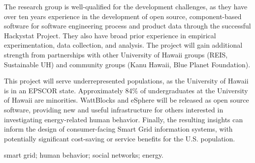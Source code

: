 The research group is well-qualified for the development challenges, as
they have over ten years experience in the development of open source,
component-based software for software engineering process and product data
through the successful Hackystat Project.  They also have broad prior experience
in empirical experimentation, data collection, and analysis.  The project will
gain additional strength from partnerships with other University of Hawaii
groups (REIS, Sustainable UH) and community groups (Kanu Hawaii, Blue
Planet Foundation).

\medskip 

This project will serve underrepresented populations, as the University of
Hawaii is in an EPSCOR state. Approximately 84\% of undergraduates at the
University of Hawaii are minorities. WattBlocks and eSphere will be
released as open source software, providing new and useful infrastructure
for others interested in investigating energy-related human behavior.
Finally, the resulting insights can inform the design of consumer-facing
Smart Grid information systems, with potentially significant cost-saving or
service benefits for the U.S. population.

\medskip

 smart grid; human behavior; social networks;
energy.




